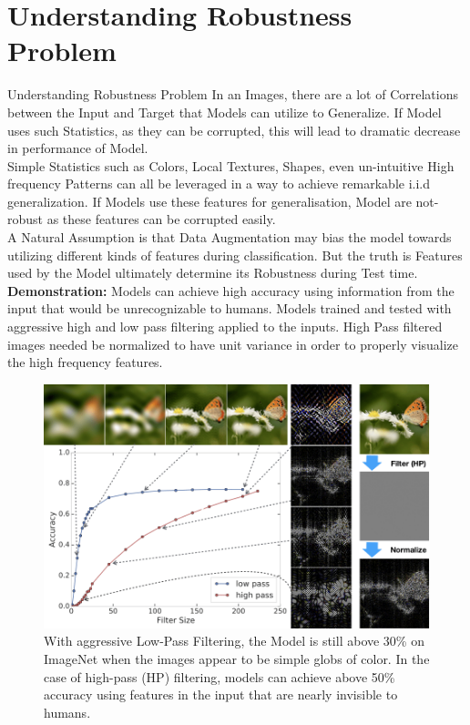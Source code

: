 \documentclass[8pt]{beamer}
\begin{document}
\section{Understanding Robustness Problem}
\begin{frame}[allowframebreaks]{Understanding Robustness Problem}
\qquad In an Images, there are a lot of Correlations between the Input and Target that Models can utilize to Generalize. If Model uses such Statistics, as they can be corrupted, this will lead to dramatic decrease in performance of Model.\\
\vspace{0.05in}
\qquad Simple Statistics such as Colors, Local Textures, Shapes, even un-intuitive High frequency Patterns can all be leveraged in a way to achieve remarkable i.i.d generalization. If Models use these features for generalisation, Model are not-robust as these features can be corrupted easily.\\
\vspace{0.05in}
\qquad A Natural Assumption is that Data Augmentation may bias the model towards utilizing different kinds of features during classification. But the truth is Features used by the Model ultimately determine its Robustness during Test time.\\
\vspace{0.05in}
\textbf{Demonstration:} Models can achieve high accuracy using information from the input that would be unrecognizable to humans. Models trained and tested with aggressive high and low pass filtering applied to the inputs. High Pass filtered images needed be normalized to have unit variance in order to properly visualize the high frequency features.
\framebreak
\begin{figure}
    \centering
    \includegraphics[scale=0.25]{../Images/Robustness.png}
    \caption{With aggressive Low-Pass Filtering, the Model is still above 30\% on ImageNet when the images appear to be simple globs of color. In the case of high-pass (HP) filtering, models can achieve above 50\% accuracy using features in the input that are nearly invisible to humans.}
    \label{fig:Robustness}
\end{figure}
\end{frame}
\end{document}
